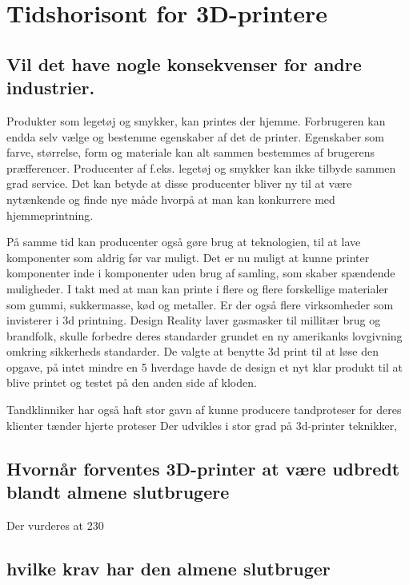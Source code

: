 
\chapter{Tidshorisont for 3D-printere}
\section{Vil det have nogle konsekvenser for andre industrier.}


Produkter som legetøj og smykker, kan printes der hjemme. Forbrugeren kan endda selv vælge og bestemme egenskaber af det de printer. Egenskaber som farve, størrelse, form og materiale kan alt sammen bestemmes af brugerens præfferencer. Producenter af f.eks. legetøj og smykker kan ikke tilbyde sammen grad service. Det kan betyde at disse producenter bliver ny til at være nytænkende og finde nye måde hvorpå at man kan konkurrere med hjemmeprintning.

På samme tid kan producenter også gøre brug at teknologien, til at lave komponenter som aldrig før var muligt. Det er nu muligt at kunne printer komponenter inde i komponenter uden brug af samling, som skaber spændende muligheder.
I takt med at man kan printe i flere og flere forskellige materialer som gummi, sukkermasse, kød og metaller. Er der også flere virksomheder som invisterer i 3d printning.
Design Reality laver gasmasker til millitær brug og brandfolk, skulle forbedre deres standarder grundet en ny amerikanks lovgivning omkring sikkerheds standarder. De valgte at benytte 3d print til at løse den opgave, på intet mindre en 5 hverdage havde de design et nyt klar produkt til at blive printet og testet på den anden side af kloden.
\cite{3ders.org_design_2013}

Tandklinniker har også haft stor gavn af kunne producere tandproteser for deres klienter
tænder
hjerte
proteser
 Der udvikles i stor grad på 3d-printer teknikker,  

\section{Hvornår forventes 3D-printer at være udbredt blandt almene slutbrugere}


Der vurderes at 230

\section{hvilke krav har den almene slutbruger}